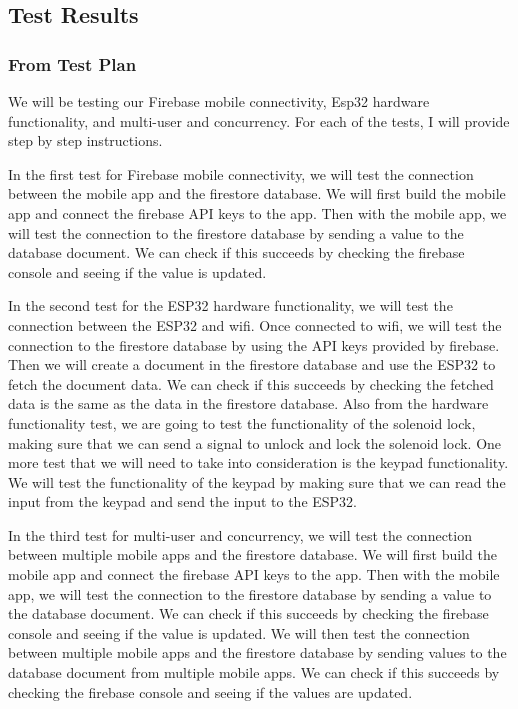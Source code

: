 \subsection{Test Results}

\subsubsection{From Test Plan}
We will be testing our Firebase mobile connectivity, Esp32 hardware functionality, and multi-user and concurrency. For each of the tests, I will provide step by step instructions.

In the first test for Firebase mobile connectivity, we will test the connection between the mobile app and the firestore database. We will first build the mobile app and connect the firebase API keys to the app. Then with the mobile app, we will test the connection to the firestore database by sending a value to the database document. We can check if this succeeds by checking the firebase console and seeing if the value is updated.

In the second test for the ESP32 hardware functionality, we will test the connection between the ESP32 and wifi. Once connected to wifi, we will test the connection to the firestore database by using the API keys provided by firebase. Then we will create a document in the firestore database and use the ESP32 to fetch the document data. We can check if this succeeds by checking the fetched data is the same as the data in the firestore database. Also from the hardware functionality test, we are going to test the functionality of the solenoid lock, making sure that we can send a signal to unlock and lock the solenoid lock. One more test that we will need to take into consideration is the keypad functionality. We will test the functionality of the keypad by making sure that we can read the input from the keypad and send the input to the ESP32.

In the third test for multi-user and concurrency, we will test the connection between multiple mobile apps and the firestore database. We will first build the mobile app and connect the firebase API keys to the app. Then with the mobile app, we will test the connection to the firestore database by sending a value to the database document. We can check if this succeeds by checking the firebase console and seeing if the value is updated. We will then test the connection between multiple mobile apps and the firestore database by sending values to the database document from multiple mobile apps. We can check if this succeeds by checking the firebase console and seeing if the values are updated.

